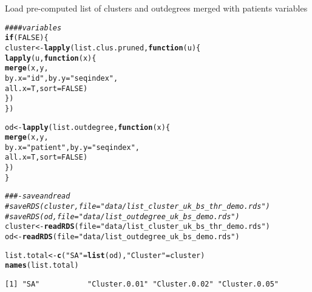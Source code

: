 \documentclass[]{revtex4}\usepackage[]{graphicx}\usepackage[]{color}
\makeatletter
\newcommand{\hlnum}[1]{\textcolor[rgb]{0.686,0.059,0.569}{#1}}%
\newcommand{\hlstr}[1]{\textcolor[rgb]{0.192,0.494,0.8}{#1}}%
\newcommand{\hlcom}[1]{\textcolor[rgb]{0.678,0.584,0.686}{\textit{#1}}}%
\newcommand{\hlstd}[1]{\textcolor[rgb]{0.345,0.345,0.345}{#1}}%
\newcommand{\hlkwa}[1]{\textcolor[rgb]{0.161,0.373,0.58}{\textbf{#1}}}%
\newcommand{\hlkwb}[1]{\textcolor[rgb]{0.69,0.353,0.396}{#1}}%
\newcommand{\hlkwc}[1]{\textcolor[rgb]{0.333,0.667,0.333}{#1}}%
\newcommand{\hlkwd}[1]{\textcolor[rgb]{0.737,0.353,0.396}{\textbf{#1}}}%
\newenvironment{kframe}{%
 \def\at@end@of@kframe{}%
 \ifinner\ifhmode%
  \def\at@end@of@kframe{\end{minipage}}%
  \begin{minipage}{\columnwidth}%
 \fi\fi%
 \def\FrameCommand##1{\hskip\@totalleftmargin \hskip-\fboxsep
 \colorbox{shadecolor}{##1}\hskip-\fboxsep
     \hskip-\linewidth \hskip-\@totalleftmargin \hskip\columnwidth}%
 \MakeFramed {\advance\hsize-\width
   \@totalleftmargin\z@ \linewidth\hsize
   \@setminipage}}%
 {\par\unskip\endMakeFramed%
 \at@end@of@kframe}
\newenvironment{knitrout}{}{} %
\makeatother
\begin{document}
Load pre-computed list of clusters and outdegrees merged with patients variables
\begin{knitrout}
\color{fgcolor}\begin{kframe}
\begin{alltt}
\hlcom{#### variables}
\hlkwa{if}\hlstd{(}\hlnum{FALSE}\hlstd{)\{}
\hlstd{cluster} \hlkwb{<-} \hlkwd{lapply}\hlstd{(list.clus.pruned,} \hlkwa{function}\hlstd{(}\hlkwc{u}\hlstd{)\{}
  \hlkwd{lapply}\hlstd{(u,} \hlkwa{function}\hlstd{(}\hlkwc{x}\hlstd{) \{}
    \hlkwd{merge}\hlstd{(x, y,}
        \hlkwc{by.x} \hlstd{=} \hlstr{"id"}\hlstd{,} \hlkwc{by.y} \hlstd{=} \hlstr{"seqindex"}\hlstd{,}
        \hlkwc{all.x} \hlstd{= T,} \hlkwc{sort} \hlstd{=} \hlnum{FALSE}\hlstd{)}
\hlstd{\})}
  \hlstd{\})}

\hlstd{od} \hlkwb{<-} \hlkwd{lapply}\hlstd{(list.outdegree,} \hlkwa{function}\hlstd{(}\hlkwc{x}\hlstd{)\{}
  \hlkwd{merge}\hlstd{(x, y,}
        \hlkwc{by.x} \hlstd{=} \hlstr{"patient"}\hlstd{,} \hlkwc{by.y} \hlstd{=} \hlstr{"seqindex"}\hlstd{,}
        \hlkwc{all.x} \hlstd{= T,} \hlkwc{sort} \hlstd{=} \hlnum{FALSE}\hlstd{)}
\hlstd{\})}
\hlstd{\}}
\end{alltt}
\end{kframe}
\end{knitrout}

\begin{knitrout}
\color{fgcolor}\begin{kframe}
\begin{alltt}
\hlcom{###- save and read}
\hlcom{# saveRDS(cluster, file = "data/list_cluster_uk_bs_thr_demo.rds")}
\hlcom{# saveRDS(od, file = "data/list_outdegree_uk_bs_demo.rds")}
\hlstd{cluster} \hlkwb{<-} \hlkwd{readRDS}\hlstd{(}\hlkwc{file} \hlstd{=} \hlstr{"data/list_cluster_uk_bs_thr_demo.rds"}\hlstd{)}
\hlstd{od} \hlkwb{<-} \hlkwd{readRDS}\hlstd{(}\hlkwc{file} \hlstd{=} \hlstr{"data/list_outdegree_uk_bs_demo.rds"}\hlstd{)}

\hlstd{list.total} \hlkwb{<-} \hlkwd{c}\hlstd{(}\hlstr{"SA"} \hlstd{=} \hlkwd{list}\hlstd{(od),} \hlstr{"Cluster"} \hlstd{= cluster)}
\hlkwd{names}\hlstd{(list.total)}
\end{alltt}
\begin{verbatim}
[1] "SA"           "Cluster.0.01" "Cluster.0.02" "Cluster.0.05"
\end{verbatim}
\end{kframe}
\end{knitrout}
\end{document}
